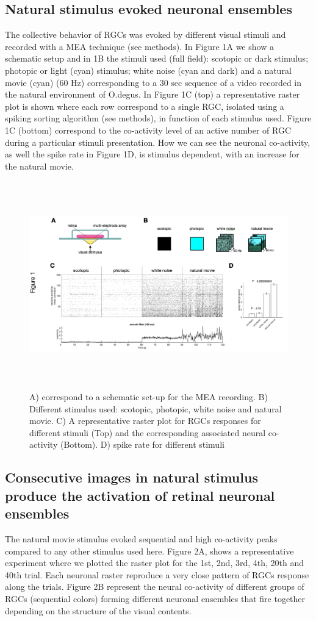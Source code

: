 \documentclass[9pt,twocolumn,twoside,lineno]{pnas-new}
\begin{document}
\subsection*{Natural stimulus evoked neuronal ensembles}
The collective behavior of RGCs was evoked by different visual stimuli and recorded with a MEA technique (see methods). In Figure 1A we show a schematic setup and in 1B the stimuli used (full field): scotopic or dark stimulus; photopic or light (cyan) stimulus; white noise (cyan and dark) and a natural movie (cyan) (60 Hz) corresponding to a 30 sec sequence of a video recorded in the natural environment of O.degus. In Figure 1C (top) a representative raster plot is shown where each row correspond to a single RGC, isolated using a spiking sorting algorithm (see methods), in function of each stimulus used. Figure 1C (bottom) correspond to the co-activity level of an active number of RGC during a particular stimuli presentation. How we can see the neuronal co-activity, as well the spike rate in Figure 1D, is stimulus dependent, with an increase for the natural movie. 

\begin{figure}
\centering
\includegraphics[width=9 cm,height=9cm]{Fig 1.png}
\caption{A) correspond to a schematic set-up for the MEA recording. B) Different stimulus used: scotopic, photopic, white noise and natural movie. C) A representative raster plot for RGCs responses for different stimuli (Top) and  the corresponding associated neural co-activity (Bottom). D) spike rate for different stimuli}
\label{fig:Figure_1.png}
\end{figure}

\subsection*{Consecutive images in natural stimulus produce the activation of retinal neuronal ensembles}
The natural movie stimulus evoked sequential and high co-activity peaks compared to any other stimulus used here. Figure 2A, shows a representative experiment where we plotted the raster plot for the 1st, 2nd, 3rd, 4th, 20th and 40th trial. Each neuronal raster reproduce a very close pattern of RGCs response along the trials. Figure 2B represent the neural co-activity of different groups of RGCs (sequential colors) forming different neuronal ensembles that fire together depending on the structure of the visual contents. 
\end{document}
